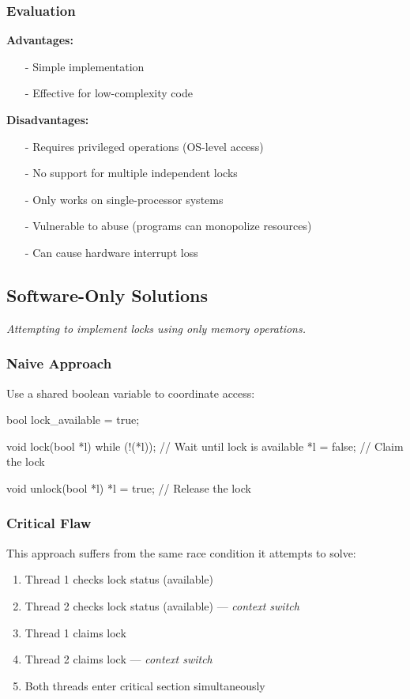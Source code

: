 \documentclass[../../compsys.tex]{subfiles}
\begin{document}
\subsubsection{Evaluation}
\textbf{Advantages:}
\begin{itemize}
  \item[-] Simple implementation
  \item[-] Effective for low-complexity code
\end{itemize}

\textbf{Disadvantages:}
\begin{itemize}
  \item[-] Requires privileged operations (OS-level access)
  \item[-] No support for multiple independent locks
  \item[-] Only works on single-processor systems
  \item[-] Vulnerable to abuse (programs can monopolize resources)
  \item[-] Can cause hardware interrupt loss
\end{itemize}
\newpage
\subsection{Software-Only Solutions}
\textit{Attempting to implement locks using only memory operations.}

\subsubsection{Naive Approach}
Use a shared boolean variable to coordinate access:

\begin{cc}
bool lock_available = true;

void lock(bool *l) {
    while (!(*l));      // Wait until lock is available
    *l = false;         // Claim the lock
}

void unlock(bool *l) {
    *l = true;          // Release the lock
}
\end{cc}

\subsubsection{Critical Flaw}
This approach suffers from the same race condition it attempts to solve:
\begin{enumerate}
  \item Thread 1 checks lock status (available)
  \item Thread 2 checks lock status (available) — \textit{context switch}
  \item Thread 1 claims lock
  \item Thread 2 claims lock — \textit{context switch}
  \item Both threads enter critical section simultaneously
\end{enumerate}
\end{document}
